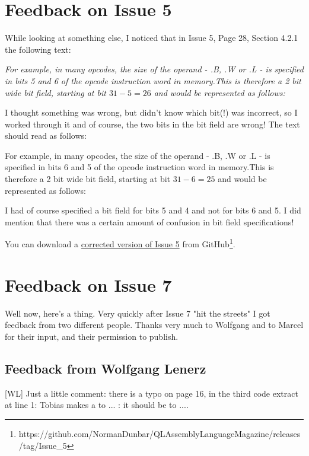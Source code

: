 \chapter{Feedback on Issue 5}

While looking at something else, I noticed that in Issue 5, Page 28, Section 4.2.1 the following text:


\emph{For example, in many opcodes, the size of the operand - .B, .W or .L - is specified in bits 5 and 6 of the opcode instruction word in memory.This is therefore a 2 bit wide bit field, starting at bit $31-5=26$ and would be represented as follows:}



I thought something was wrong, but didn't know which bit(!) was incorrect, so I worked through it and of course, the two bits in the bit field are wrong! The text should read as follows:

For example, in many opcodes, the size of the operand - .B, .W or .L - is specified in bits 6 and 5 of the opcode instruction word in memory.This is therefore a 2 bit wide bit field, starting at bit $31-6=25$ and would be represented as follows:


I had of course specified a bit field for bits 5 and 4 and not for bits 6 and 5. I did mention that there was a certain amount of confusion in bit field specifications!

You can download a \href{https://github.com/NormanDunbar/QLAssemblyLanguageMagazine/releases/tag/Issue_5}{corrected version of Issue 5} from GitHub\footnote{https://github.com/NormanDunbar/QLAssemblyLanguageMagazine/releases/tag/Issue\_5}.


\chapter{Feedback on Issue 7}

Well now, here's a thing. Very quickly after Issue 7 "hit the streets" I got feedback from two different people. Thanks very much to Wolfgang and to Marcel for their input, and their permission to publish.


\section{Feedback from Wolfgang Lenerz}

[WL] Just a little comment: there is a typo on page 16, in the third code extract at line 1: Tobias makes a  to ... : it should be to ....

